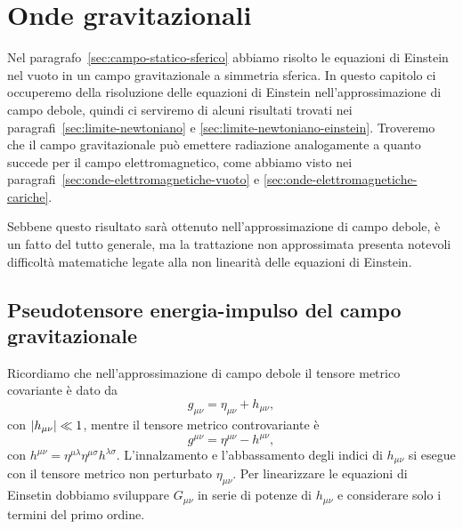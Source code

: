 \chapter{Onde gravitazionali}
\label{cha:onde-grav}

Nel paragrafo~\ref{sec:campo-statico-sferico} abbiamo risolto le equazioni di
Einstein nel vuoto in un campo gravitazionale a simmetria sferica.  In questo
capitolo ci occuperemo della risoluzione delle equazioni di Einstein
nell'approssimazione di campo debole, quindi ci serviremo di alcuni risultati
trovati nei paragrafi~\ref{sec:limite-newtoniano} e
\ref{sec:limite-newtoniano-einstein}.  Troveremo che il campo gravitazionale può
emettere radiazione analogamente a quanto succede per il campo elettromagnetico,
come abbiamo visto nei paragrafi~\ref{sec:onde-elettromagnetiche-vuoto} e
\ref{sec:onde-elettromagnetiche-cariche}.

Sebbene questo risultato sarà ottenuto nell'approssimazione di campo debole, è
un fatto del tutto generale, ma la trattazione non approssimata presenta
notevoli difficoltà matematiche legate alla non linearità delle equazioni di
Einstein.

\section{Pseudotensore energia-impulso del campo gravitazionale}
\label{sec:energ-impulso-grav}

Ricordiamo che nell'approssimazione di campo
debole il tensore metrico covariante è dato da
\begin{equation}
  g_{\mu\nu} = \eta_{\mu\nu} + h_{\mu\nu},
\end{equation}
con $\lvert h_{\mu\nu}\rvert \ll 1$, mentre il tensore metrico controvariante è
\begin{equation}
  g^{\mu\nu} = \eta^{\mu\nu} - h^{\mu\nu},
\end{equation}
con $h^{\mu\nu} = \eta^{\mu\lambda}\eta^{\mu\sigma} h^{\lambda\sigma}$.
L'innalzamento e l'abbassamento degli indici di $h_{\mu\nu}$ si esegue con il
tensore metrico non perturbato $\eta_{\mu\nu}$.  Per linearizzare le equazioni
di Einsetin dobbiamo sviluppare $G_{\mu\nu}$ in serie di potenze di $h_{\mu\nu}$
e considerare solo i termini del primo ordine.

